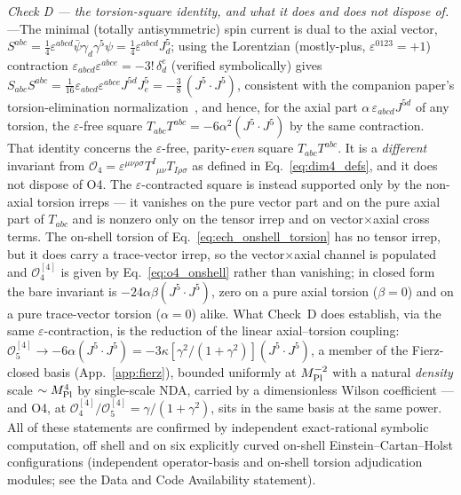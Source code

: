 \documentclass[aps,prd,twocolumn,superscriptaddress,showpacs,preprintnumbers,nofootinbib,longbibliography,floatfix]{revtex4-2}
\newcommand{\MPl}{M_{\rm Pl}}
\begin{document}
\textit{Check D --- the torsion-square identity, and what it does and does
not dispose of.}---The minimal (totally
antisymmetric) spin current is dual to the axial vector,
$S^{abc}=\tfrac14\varepsilon^{abcd}\bar\psi\gamma_d\gamma^5\psi=\tfrac14\varepsilon^{abcd}J^5_d$; using
the Lorentzian (mostly-plus, $\varepsilon^{0123}=+1$) contraction
$\varepsilon_{abcd}\varepsilon^{abce}=-3!\,\delta^e_d$ (verified symbolically)
gives $S_{abc}S^{abc}=\tfrac{1}{16}\varepsilon_{abcd}\varepsilon^{abce}J^{5d}J^5_e=-\tfrac38\,(J^5\!\cdot\!J^5)$,
consistent with the companion paper's torsion-elimination
normalization~\cite{Golden2026P1a}, and hence, for the axial part
$\alpha\,\varepsilon_{abcd}J^{5d}$ of any torsion, the $\varepsilon$-free
square $T_{abc}T^{abc}=-6\alpha^2(J^5\!\cdot\!J^5)$
by the same contraction. That identity concerns the $\varepsilon$-free,
parity-\emph{even} square $T_{abc}T^{abc}$. It is a \emph{different}
invariant from
$\mathcal{O}_4=\varepsilon^{\mu\nu\rho\sigma}T^I{}_{\mu\nu}T_{I\rho\sigma}$
as defined in Eq.~\eqref{eq:dim4_defs}, and it does not dispose of O4.
The $\varepsilon$-contracted square is instead supported only by the
non-axial torsion irreps --- it vanishes on the pure vector part and on
the pure axial part of $T_{abc}$ and is nonzero only on the tensor irrep
and on vector$\times$axial cross terms. The on-shell torsion of
Eq.~\eqref{eq:ech_onshell_torsion} has no tensor irrep, but it does carry
a trace-vector irrep, so the vector$\times$axial channel is populated and
$\mathcal{O}_4^{[4]}$ is given by Eq.~\eqref{eq:o4_onshell} rather than
vanishing; in closed form the bare invariant is $-24\alpha\beta
(J^5\!\cdot\!J^5)$, zero on a pure axial torsion ($\beta=0$) and on a
pure trace-vector torsion ($\alpha=0$) alike.
What Check~D does establish, via the same
$\varepsilon$-contraction, is the reduction of the linear axial--torsion
coupling: $\mathcal{O}_5^{[4]}\to-6\alpha(J^5\!\cdot\!J^5)
=-3\kappa[\gamma^2/(1+\gamma^2)](J^5\!\cdot\!J^5)$, a
member of the Fierz-closed basis
(App.~\ref{app:fierz}), bounded uniformly at $\MPl^{-2}$ with a natural
\emph{density} scale $\sim\MPl^4$ by single-scale NDA, carried by a
dimensionless Wilson coefficient --- and O4, at
$\mathcal{O}_4^{[4]}/\mathcal{O}_5^{[4]}=\gamma/(1+\gamma^2)$, sits in
the same basis at the same power. All of these statements are confirmed
by independent exact-rational symbolic computation, off shell and on six
explicitly curved on-shell Einstein--Cartan--Holst configurations
(independent operator-basis and on-shell torsion adjudication modules;
see the Data and Code Availability statement).
\end{document}
